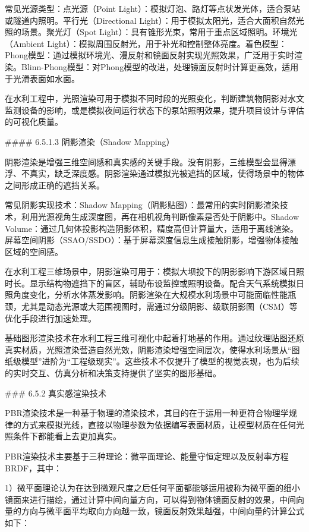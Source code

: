 常见光源类型：点光源（Point Light）：模拟灯泡、路灯等点状发光体，适合泵站或隧道内照明。平行光（Directional Light）：用于模拟太阳光，适合大面积自然光照的场景。聚光灯（Spot Light）：具有锥形光束，常用于重点区域照明。环境光（Ambient Light）：模拟周围反射光，用于补光和控制整体亮度。着色模型：Phong模型：通过模拟环境光、漫反射和镜面反射实现光照效果，广泛用于实时渲染。Blinn-Phong模型：对Phong模型的改进，处理镜面反射时计算更高效，适用于光滑表面如水面。

在水利工程中，光照渲染可用于模拟不同时段的光照变化，判断建筑物阴影对水文监测设备的影响，或是模拟夜间运行状态下的泵站照明效果，提升项目设计与评估的可视化质量。

\#\#\#\# 6.5.1.3 阴影渲染（Shadow Mapping）

阴影渲染是增强三维空间感和真实感的关键手段。没有阴影，三维模型会显得漂浮、不真实，缺乏深度感。阴影渲染通过模拟光被遮挡的区域，使得场景中的物体之间形成正确的遮挡关系。

常见阴影实现技术：Shadow Mapping（阴影贴图）：最常用的实时阴影渲染技术，利用光源视角生成深度图，再在相机视角判断像素是否处于阴影中。Shadow Volume：通过几何体投影构造阴影体积，精度高但计算量大，适用于离线渲染。屏幕空间阴影（SSAO/SSDO）：基于屏幕深度信息生成接触阴影，增强物体接触区域的空间感。

在水利工程三维场景中，阴影渲染可用于：模拟大坝投下的阴影影响下游区域日照时长。显示结构物遮挡下的盲区，辅助布设监控或照明设备。配合天气系统模拟日照角度变化，分析水体蒸发影响。阴影渲染在大规模水利场景中可能面临性能瓶颈，尤其是动态光源或大范围视图时，需通过分级阴影、级联阴影图（CSM）等优化手段进行加速处理。

基础图形渲染技术在水利工程三维可视化中起着打地基的作用。通过纹理贴图还原真实材质，光照渲染营造自然光效，阴影渲染增强空间层次，使得水利场景从``图纸级模型''进阶为``工程级现实''。这些技术不仅提升了模型的视觉表现，也为后续的实时交互、仿真分析和决策支持提供了坚实的图形基础。

\#\#\# 6.5.2 真实感渲染技术

PBR渲染技术是一种基于物理的渲染技术，其目的在于运用一种更符合物理学规律的方式来模拟光线，直接以物理参数为依据编写表面材质，让模型材质在任何光照条件下都能看上去更加真实。

PBR渲染技术主要基于三种理论：微平面理论、能量守恒定理以及反射率方程BRDF，其中：

1）微平面理论认为在达到微观尺度之后任何平面都能够运用被称为微平面的细小镜面来进行描绘，通过计算中间向量方向，可以得到物体镜面反射的效果，中间向量的方向与微平面平均取向方向越一致，镜面反射效果越强，中间向量的计算公式如下：

